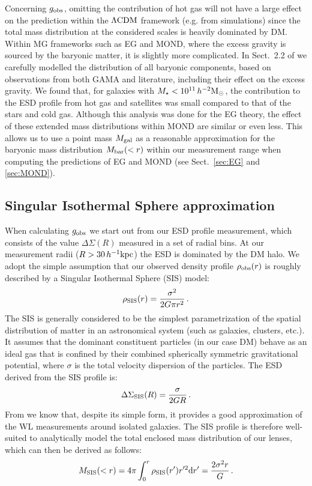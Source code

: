 \documentclass[usenatbib]{mnras}
\newcommand{\hmsun}{\,h^{-2} {\rm M_\odot}}
\newcommand{\hkpc}{\, h^{-1}{\rm{kpc}} }
\newcommand{\lcdm}{{\rm \Lambda CDM}}
\newcommand{\un}[1]{_{\rm #1}}
\begin{document}
Concerning $g\un{obs}$, omitting the contribution of hot gas will not have a large effect on the prediction within the $\lcdm$ framework (e.g. from simulations) since the total mass distribution at the considered scales is heavily dominated by DM. Within MG frameworks such as EG and MOND, where the excess gravity is sourced by the baryonic matter, it is slightly more complicated. In Sect.~2.2 of \cite{brouwer2017} we carefully modelled the distribution of all baryonic components, based on observations from both GAMA and literature, including their effect on the excess gravity. We found that, for galaxies with $M_\star<10^{11}\hmsun$, the contribution to the ESD profile from hot gas and satellites was small compared to that of the stars and cold gas. Although this analysis was done for the EG theory, the effect of these extended mass distributions within MOND are similar or even less. This allows us to use a point mass $M\un{gal}$ as a reasonable approximation for the baryonic mass distribution $M\un{bar}(<r)$ within our measurement range when computing the predictions of EG and MOND (see Sect.~\ref{sec:EG} and \ref{sec:MOND}).

\subsection{Singular Isothermal Sphere approximation}
\label{sec:SIS_approximation}

When calculating $g\un{obs}$ we start out from our ESD profile measurement, which consists of the value $\Delta\Sigma(R)$ measured in a set of radial bins. At our measurement radii ($R>30\hkpc$) the ESD is dominated by the DM halo. We adopt the simple assumption that our observed density profile $\rho\un{obs}(r)$ is roughly described by a Singular Isothermal Sphere (SIS) model:
\begin{equation}\label{eq:rho_SIS}
	\rho\un{SIS}(r) = \frac{\sigma^2}{2 G \pi r^2} \, . 
\end{equation}
The SIS is generally considered to be the simplest parametrization of the spatial distribution of matter in an astronomical system (such as galaxies, clusters, etc.). It assumes that the dominant constituent particles (in our case DM) behave as an ideal gas that is confined by their combined spherically symmetric gravitational potential, where $\sigma$ is the total velocity dispersion of the particles. The ESD derived from the SIS profile is:
\begin{equation}\label{eq:ESD_SIS}
\Delta\Sigma\un{SIS}(R) = \frac{\sigma}{2 G R} \, .
\end{equation}
From \cite{brouwer2017} we know that, despite its simple form, it provides a good approximation of the WL measurements around isolated galaxies. The SIS profile is therefore well-suited to analytically model the total enclosed mass distribution of our lenses, which can then be derived as follows:
\begin{equation}\label{eq:mass_SIS}
	M\un{SIS}(<r) = 4 \pi \int_{0}^{r}\rho\un{SIS}(r') r'^2 {\rm d} r' = \frac{2\sigma^2 r}{G} \, .
\end{equation}
\end{document}
